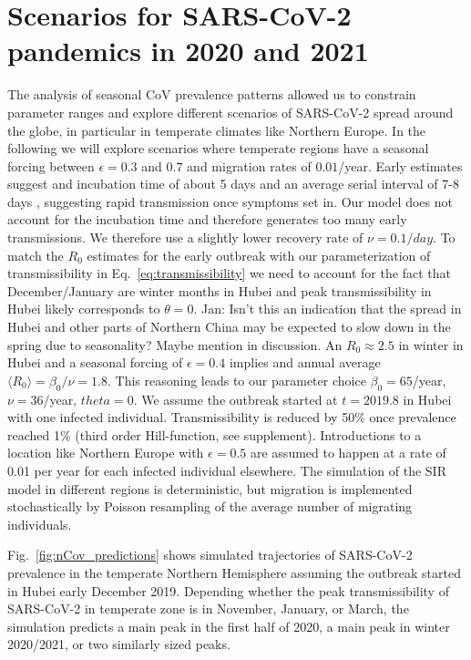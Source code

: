 \documentclass[rmp, reprint, superscriptaddress, floatfix,amsmath]{revtex4-1}
\newcommand{\Jan}[1]{{\color{deepsaffron}Jan: #1}}
\begin{document}
\section{Scenarios for SARS-CoV-2 pandemics in 2020 and 2021}
The analysis of seasonal CoV prevalence patterns allowed us to constrain parameter ranges and explore different scenarios of SARS-CoV-2 spread around the globe, in particular in temperate climates like Northern Europe. 
In the following we will explore scenarios where temperate regions have a seasonal forcing between $\epsilon=0.3$ and $0.7$ and migration rates of $0.01$/year. 
Early estimates suggest and incubation time of about 5 days \citep{backer_incubation_2020} and an average serial interval of 7-8 days \citep{wu_nowcasting_2020}, suggesting rapid transmission once symptoms set in. 
Our model does not account for the incubation time and therefore generates too many early transmissions. 
We therefore use a slightly lower recovery rate of $\nu = 0.1/day$. 
To match the $R_0$ estimates for the early outbreak with our parameterization of transmissibility in Eq.~\ref{eq:transmissibility} we need to account for the fact that December/January are winter months in Hubei and peak transmissibility in Hubei likely corresponds to $\theta=0$. \Jan{Isn't this an indication that the spread in Hubei and other parts of Northern China may be expected to slow down in the spring due to seasonality? Maybe mention in discussion.}
An $R_0\approx 2.5$ in winter in Hubei and a seasonal forcing of $\epsilon=0.4$ implies and annual average $\langle R_0\rangle = \beta_0/\nu=1.8$.
This reasoning leads to our parameter choice $\beta_0=65$/year, $\nu=36$/year, $theta=0$. 
We assume the outbreak started at $t=2019.8$ in Hubei with one infected individual.
Transmissibility is reduced by 50\% once prevalence reached 1\% (third order Hill-function, see supplement).
Introductions to a location like Northern Europe with $\epsilon=0.5$ are assumed to happen at a rate of 0.01 per year for each infected individual elsewhere.
The simulation of the SIR model in different regions is deterministic, but migration is implemented stochastically by Poisson resampling of the average number of migrating individuals. 

Fig.~\ref{fig:nCov_predictions} shows simulated trajectories of SARS-CoV-2 prevalence in the temperate Northern Hemisphere assuming the outbreak started in Hubei early December 2019.
Depending whether the peak transmissibility of SARS-CoV-2 in temperate zone is in November, January, or March, the simulation predicts a main peak in the first half of 2020, a main peak in winter 2020/2021, or two similarly sized peaks.
\end{document}
